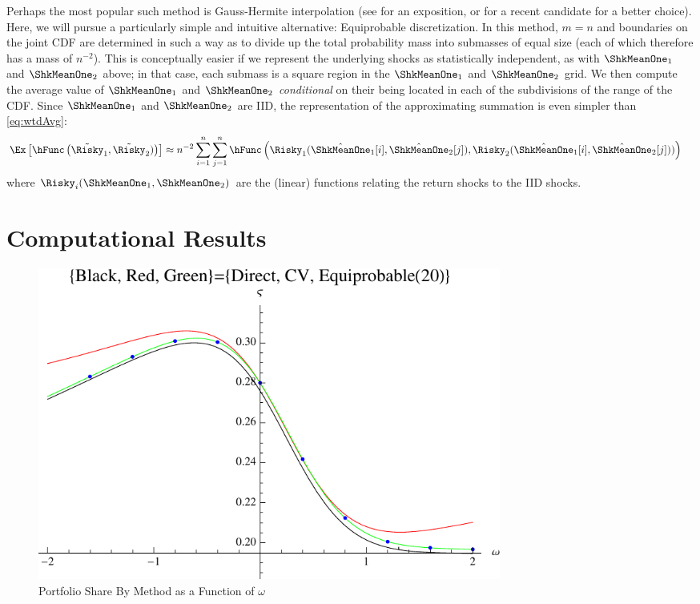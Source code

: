 Perhaps the most popular such method is Gauss-Hermite interpolation
(see \cite{judd:book} for an exposition, or \cite{kopecky2010finite}
for a recent candidate for a better choice).  Here, we will pursue a
particularly simple and intuitive alternative: Equiprobable discretization.  In
this method, $m=n$ and boundaries on the joint CDF are determined in
such a way as to divide up the total probability mass into submasses
of equal size (each of which therefore has a mass of $n^{-2}$).  This
is conceptually easier if we represent the underlying shocks as
statistically independent, as with $\ShkMeanOne_{1}$ and
$\ShkMeanOne_{2}$ above; in that case, each submass is a square region
in the $\ShkMeanOne_{1}$ and $\ShkMeanOne_{2}$ grid.  We then compute
the average value of $\ShkMeanOne_{1}$ and $\ShkMeanOne_{2}$ {\it
  conditional} on their being located in each of the subdivisions of
the range of the CDF.  Since $\ShkMeanOne_{1}$ and $\ShkMeanOne_{2}$
are IID, the representation of the approximating summation is even
simpler than \eqref{eq:wtdAvg}:
\begin{equation*}\begin{gathered}\begin{aligned}
  \Ex\left[\hFunc\left(\tilde{\Risky}_{1},\tilde{\Risky}_{2})\right)\right] & \approx  n^{-2} \sum_{i=1}^{n}\sum_{j=1}^{n} \hFunc\left(\Risky_{1}(\hat{\ShkMeanOne}_{1}[i],\hat{\ShkMeanOne}_{2}[j]),\Risky_{2}(\hat{\ShkMeanOne}_{1}[i],\hat{\ShkMeanOne}_{2}[j]))\right) \label{eq:wtdAvgMod}
\end{aligned}\end{gathered}\end{equation*}
where $\Risky_{i}(\ShkMeanOne_{1},\ShkMeanOne_{2})$ are the (linear) functions relating the return shocks to the IID shocks.


\section{Computational Results}
\begin{figure}
\includegraphics[width=6in]{../Figures/ShareVsCovByMethod}
\caption{Portfolio Share By Method as a Function of $\omega$}\label{fig:ShareVsCovByMethod}
\end{figure}

